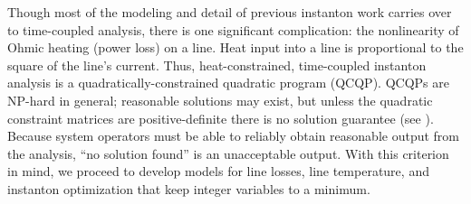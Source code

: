 \documentclass[conference]{IEEEtran}
\begin{document}
Though most of the modeling and detail of previous instanton work carries over to time-coupled analysis, there is one significant complication:  the nonlinearity of Ohmic heating (power loss) on a line. Heat input into a line is proportional to the square of the line's current. Thus, heat-constrained, time-coupled instanton analysis is a quadratically-constrained quadratic program (QCQP). QCQPs are NP-hard in general; reasonable solutions may exist, but unless the quadratic constraint matrices are positive-definite there is no solution guarantee (see \cite{mehanna2014}). Because system operators must be able to reliably obtain reasonable output from the analysis, ``no solution found'' is an unacceptable output. With this criterion in mind, we proceed to develop models for line losses, line temperature, and instanton optimization that keep integer variables to a minimum.


\end{document}
